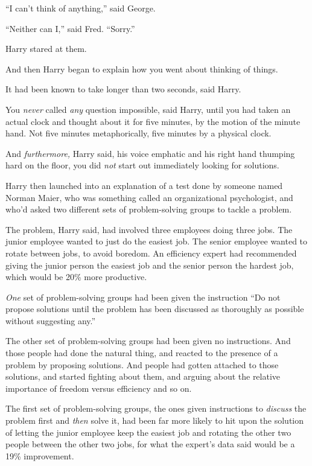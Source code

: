``I can't think of anything,'' said George.

``Neither can I,'' said Fred. ``Sorry.''

Harry stared at them.

And then Harry began to explain how you went about thinking of things.

It had been known to take longer than two seconds, said Harry.

You \emph{never} called \emph{any} question impossible, said Harry, until you had taken an actual clock and thought about it for five minutes, by the motion of the minute hand. Not five minutes metaphorically, five minutes by a physical clock.

And \emph{furthermore,} Harry said, his voice emphatic and his right hand thumping hard on the floor, you did \emph{not} start out immediately looking for solutions.

Harry then launched into an explanation of a test done by someone named Norman Maier, who was something called an organizational psychologist, and who'd asked two different sets of problem-solving groups to tackle a problem.

The problem, Harry said, had involved three employees doing three jobs. The junior employee wanted to just do the easiest job. The senior employee wanted to rotate between jobs, to avoid boredom. An efficiency expert had recommended giving the junior person the easiest job and the senior person the hardest job, which would be 20\% more productive.

\emph{One} set of problem-solving groups had been given the instruction ``Do not propose solutions until the problem has been discussed as thoroughly as possible without suggesting any.''

The other set of problem-solving groups had been given no instructions. And those people had done the natural thing, and reacted to the presence of a problem by proposing solutions. And people had gotten attached to those solutions, and started fighting about them, and arguing about the relative importance of freedom versus efficiency and so on.

The first set of problem-solving groups, the ones given instructions to \emph{discuss} the problem first and \emph{then} solve it, had been far more likely to hit upon the solution of letting the junior employee keep the easiest job and rotating the other two people between the other two jobs, for what the expert's data said would be a 19\% improvement.

